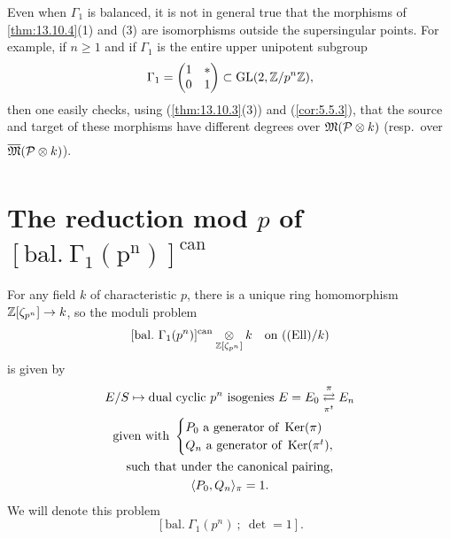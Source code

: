 \begin{kcautrem}\label{cautrem:13.10.5}
Even when $\Gamma_1$ is balanced, it is not in general true that the morphisms of \ref{thm:13.10.4}(1) and (3) are isomorphisms outside the supersingular points. For example, if $n \ge 1$ and if $\Gamma_1$ is the entire upper unipotent subgroup
\[
\Gamma_1 = \begin{pmatrix} 1 & * \\ 0 & 1 \end{pmatrix} \subset \operatorname{GL}(2, \mathbb{Z}/p^n\mathbb{Z}) ,
\]
then one easily checks, using (\ref{thm:13.10.3}(3)) and (\ref{cor:5.5.3}), that the source and target of these morphisms have different degrees over $\mathfrak{M}(\mathcal{P} \underset{}{\otimes} k)$ (resp.\ over $\overline{\mathfrak{M}}(\mathcal{P} \underset{}{\otimes} k)$).
\end{kcautrem}

\section[The reduction mod {$p$} of {$\mathrm{[bal.\ \Gamma_1(p^n)]^{\mathrm{can}}}$}]%
{The reduction mod $p$ of \texorpdfstring{$\mathrm{[bal.\ \Gamma_1(p^n)]^{\mathrm{can}}}$}{[bal. Gamma_1(p^n)]\^{}can}}

\kmitem\label{item:13.11.1}
For any field $k$ of characteristic $p$, there is a unique ring homomorphism $\mathbb{Z}[\zeta_{p^n}] \to k$, so the moduli problem
\[
[\mathrm{bal.\ }\Gamma_1(p^n)]^{\mathrm{can}} \tens{\Z[\zeta_{p^n}]} k \quad\text{on } (\Ell/k)
\]
is given by
\begin{equation}\label{eq:13.11.1.1}
\begin{gathered}
E/S \mapsto \text{dual cyclic $p^n$ isogenies } E = E_0 \overset{\pi}{\underset{\pi^t}{\rightleftarrows}} E_n \\
\text{given with } \begin{cases} P_0 \text{ a generator of } \operatorname{Ker}(\pi) \\ Q_n \text{ a generator of } \operatorname{Ker}(\pi^t) , \end{cases} \\
\text{such that under the canonical pairing,} \\
\langle P_0, Q_n \rangle_\pi = 1 .
\end{gathered}
\end{equation}
We will denote this problem
\begin{equation}\label{eq:13.11.1.2}
[\mathrm{bal.\ }\Gamma_1(p^n)\ ;\ \det = 1] .
\end{equation}

